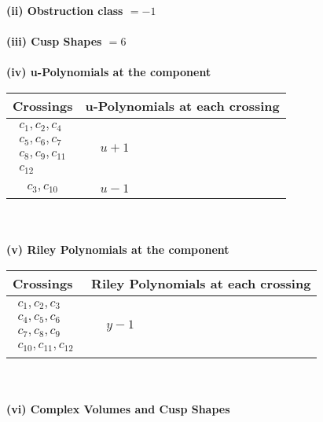 \documentclass[1p]{elsarticle_modified}
\theoremstyle{definition}
\begin{document}
\flushleft \textbf{(ii) Obstruction class $= -1$}\\~\\
\flushleft \textbf{(iii) Cusp Shapes $= 6$}\\~\\
\newpage\renewcommand{\arraystretch}{1}
\flushleft \textbf{(iv) u-Polynomials at the component}\newline \\
\begin{tabular}{m{50pt}|m{274pt}}
Crossings & \hspace{64pt}u-Polynomials at each crossing \\
\hline $$\begin{aligned}c_{1},c_{2},c_{4}\\c_{5},c_{6},c_{7}\\c_{8},c_{9},c_{11}\\c_{12}\end{aligned}$$&$\begin{aligned}
&u+1
\end{aligned}$\\
\hline $$\begin{aligned}c_{3},c_{10}\end{aligned}$$&$\begin{aligned}
&u-1
\end{aligned}$\\
\hline
\end{tabular}\\~\\
\newpage\renewcommand{\arraystretch}{1}
\flushleft \textbf{(v) Riley Polynomials at the component}\newline \\
\begin{tabular}{m{50pt}|m{274pt}}
Crossings & \hspace{64pt}Riley Polynomials at each crossing \\
\hline $$\begin{aligned}c_{1},c_{2},c_{3}\\c_{4},c_{5},c_{6}\\c_{7},c_{8},c_{9}\\c_{10},c_{11},c_{12}\end{aligned}$$&$\begin{aligned}
&y-1
\end{aligned}$\\
\hline
\end{tabular}\\~\\
\newpage\flushleft \textbf{(vi) Complex Volumes and Cusp Shapes}
\end{document}
